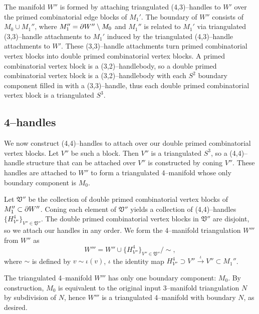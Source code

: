 The manifold $W''$ is formed by attaching triangulated (4,3)--handles to $W'$ over the primed combinatorial edge blocks of $M_1'$.
The boundary of $W''$ consists of $M_0 \cup M_1''$, where $M_1''=\partial W''\setminus M_0$ and $M_1''$ is related to $M_1'$ via triangulated (3,3)--handle attachments to $M_1'$ induced by the triangulated (4,3)--handle attachments to $W'$.
These (3,3)--handle attachments turn primed combinatorial vertex blocks into double primed combinatorial vertex blocks.
A primed combinatorial vertex block is a (3,2)--handlebody, so a  double primed combinatorial vertex block is a (3,2)--handlebody with each $S^2$ boundary component filled in with a (3,3)--handle, thus each double primed combinatorial vertex block is a triangulated $S^3$.

\subsection{4--handles}

We now construct (4,4)--handles to attach over our double primed combinatorial vertex blocks.
Let $V''$ be such a block.
Then $V''$ is a triangulated $S^3$, so a (4,4)--handle structure that can be attached over $V''$ is constructed by coning $V''$.
These handles are attached to $W''$ to form a triangulated 4--manifold whose only boundary component is $M_0$.

Let $\mathfrak{V}''$ be the collection of double primed combinatorial vertex blocks of $M_1''\subset \partial W''$.
Coning each element of $\mathfrak{V}''$ yields a collection of (4,4)--handles $\{H_{V''}^4\}_{V''\in\mathfrak{V}''}$.
The double primed combinatorial vertex blocks in $\mathfrak{V}''$ are disjoint, so we attach our handles in any order.
We form the 4--manifold triangulation $W'''$ from $W''$ as
\[
W''' = W''\cup\{H_{V''}^4\}_{V''\in\mathfrak{V}''}/\sim,
\]
where $\sim$ is defined by $v\sim \iota(v)$, $\iota$ the identity map $H_{V''}^4\supset V''\overset{\iota}{\to} V''\subset M_1''$.

The triangulated 4--manifold $W'''$ has only one boundary component: $M_0$.
By construction, $M_0$ is equivalent to the original input 3--manifold triangulation $N$ by subdivision of $N$, hence $W'''$ is a triangulated 4--manifold with boundary $N$, as desired.

